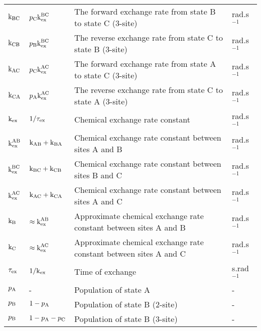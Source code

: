 \begin{center}
\begin{small}
\begin{longtable}{llll}
$\textrm{k}_{\textrm{BC}}$             & $p_{\textrm{C}}\textrm{k}_{\textrm{ex}}^{\textrm{BC}}$                    & The forward exchange rate from state B to state C (3-site)                    & rad.s$^{-1}$ \\
$\textrm{k}_{\textrm{CB}}$             & $p_{\textrm{B}}\textrm{k}_{\textrm{ex}}^{\textrm{BC}}$                    & The reverse exchange rate from state C to state B (3-site)                    & rad.s$^{-1}$ \\
$\textrm{k}_{\textrm{AC}}$             & $p_{\textrm{C}}\textrm{k}_{\textrm{ex}}^{\textrm{AC}}$                    & The forward exchange rate from state A to state C (3-site)                    & rad.s$^{-1}$ \\
$\textrm{k}_{\textrm{CA}}$             & $p_{\textrm{A}}\textrm{k}_{\textrm{ex}}^{\textrm{AC}}$                    & The reverse exchange rate from state C to state A (3-site)                    & rad.s$^{-1}$ \\
$\textrm{k}_{\textrm{ex}}$             & $1 / \tau_{\textrm{ex}}$                     & Chemical exchange rate constant                                               & rad.s$^{-1}$ \\
$\textrm{k}_{\textrm{ex}}^{\textrm{AB}}$           & $\textrm{k}_{\textrm{AB}} + \textrm{k}_{\textrm{BA}}$                  & Chemical exchange rate constant between sites A and B                         & rad.s$^{-1}$ \\
$\textrm{k}_{\textrm{ex}}^{\textrm{BC}}$           & $\textrm{k}_{\textrm{BC}} + \textrm{k}_{\textrm{CB}}$                  & Chemical exchange rate constant between sites B and C                         & rad.s$^{-1}$ \\
$\textrm{k}_{\textrm{ex}}^{\textrm{AC}}$           & $\textrm{k}_{\textrm{AC}} + \textrm{k}_{\textrm{CA}}$                  & Chemical exchange rate constant between sites A and C                         & rad.s$^{-1}$ \\
$\textrm{k}_{\textrm{B}}$              & $\approx \textrm{k}_{\textrm{ex}}^{\textrm{AB}}$               & Approximate chemical exchange rate constant between sites A and B             & rad.s$^{-1}$ \\
$\textrm{k}_{\textrm{C}}$              & $\approx \textrm{k}_{\textrm{ex}}^{\textrm{AC}}$               & Approximate chemical exchange rate constant between sites A and C             & rad.s$^{-1}$ \\
$\tau_{\textrm{ex}}$             & $1 / \textrm{k}_{\textrm{ex}}$                     & Time of exchange                                                              & s.rad$^{-1}$ \\
$p_{\textrm{A}}$              & -                              & Population of state A                                                         & - \\
$p_{\textrm{B}}$              & $1-p_{\textrm{A}}$                        & Population of state B (2-site)                                                & - \\
$p_{\textrm{B}}$              & $1-p_{\textrm{A}}-p_{\textrm{C}}$                    & Population of state B (3-site)                                                & - \\

\end{longtable}
\end{small}
\end{center}
